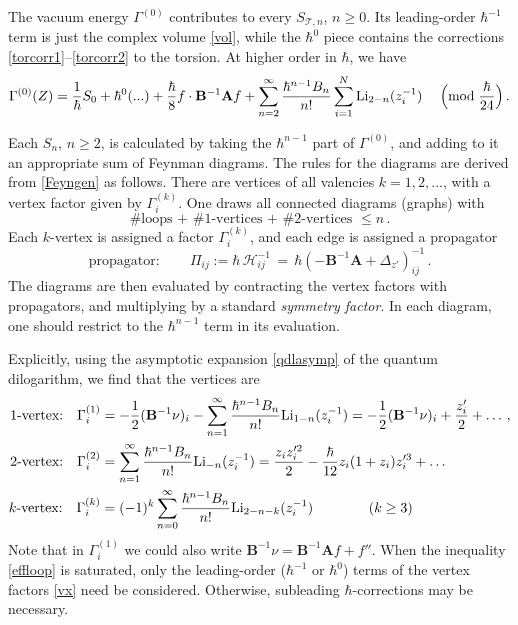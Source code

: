 \documentclass[12pt]{amsart}
\newcommand{\lbl}{\label}
\renewcommand{\eta}{\nu}
\theoremstyle{definition}
\def\be{  \begin{equation} }
\def\ee{  \end{equation} }
\newcommand{\CH}{\mathcal{H}}
\newcommand{\CT}{\mathcal{T}}
\newcommand{\Li}{{\rm Li}}
\newcommand{\mb}{\mathbf}
\numberwithin{equation}{section}
\begin{document}
The vacuum energy $\Gamma^{(0)}$ contributes to every $S_{\CT,n}$, $n\geq 0$. Its leading-order $\hbar^{-1}$ term is just the complex volume \eqref{vol}, while the $\hbar^0$ piece contains 
the corrections \eqref{torcorr1}--\eqref{torcorr2} to the torsion. At 
higher order in $\hbar$, we have
%
\be \Gamma^{(0)}(Z) = \frac{1}{\hbar}S_0+\hbar^0(...)
+\frac{\hbar}{8}f\cdot\mb B^{-1}\mb A f + \sum_{n=2}^\infty 
\frac{\hbar^{n-1} B_{n}}{n!}\sum_{i=1}^N \Li_{2-n}(z_i^{-1})\quad\; 
\Big({\rm mod}\;\frac{\hbar}{24}\Big)\,. \ee



Each $S_n$, $n\geq 2$, is calculated by taking the $\hbar^{n-1}$ part 
of $\Gamma^{(0)}$, and adding to it an appropriate sum of Feynman diagrams. 
The rules for the diagrams are derived from \eqref{Feyngen} as follows. There are vertices of all 
valencies $k=1,2,...$, with a vertex factor given by $\Gamma^{(k)}_i$. One draws all connected diagrams (graphs) with
%
\be \lbl{effloop}
\boxed{\text{\# loops + \# 1-vertices + \# 2-vertices $\leq n$}\,.}
\ee
%
Each $k$-vertex is assigned a factor $\Gamma_i^{(k)}$, and each edge is assigned a propagator
%
\be 
\lbl{prop}
\text{propagator}:\qquad \Pi_{ij}:= \hbar\,\CH^{-1}_{ij} \,
=\, \hbar(-\mb B^{-1}\mb A+\Delta_{z'})^{-1}_{ij}\,.
\ee
%
The diagrams are then evaluated by contracting the vertex factors with propagators, and multiplying by a standard \emph{symmetry factor}. In each diagram, one should restrict to the $\hbar^{n-1}$ term in its evaluation.


Explicitly, using the asymptotic expansion \eqref{qdlasymp} of the quantum dilogarithm, we find that the vertices are 
%
\begin{subequations} 
\lbl{vx}
\begin{align}
\text{1-vertex:}\quad \Gamma^{(1)}_i &= -\frac12(\mb B^{-1}\eta)_i
-\sum_{n=1}^\infty \frac{\hbar^{n-1}B_n}{n!}\Li_{1-n}(z_i^{-1}) 
= -\frac12(\mb B^{-1}\eta)_i  +\frac{z'_i}{2}+\ldots\,,\\
\text{2-vertex:}\quad \Gamma^{(2)}_i &= \sum_{n=1}^\infty 
\frac{\hbar^{n-1}B_n}{n!}\Li_{-n}(z_i^{-1}) = \frac{z_iz_i'^2}{2}
-\frac\hbar{12}z_i(1+z_i)z_i'^3+\ldots\\
\text{$k$-vertex:}\quad\Gamma^{(k)}_i &= (-1)^k \sum_{n=0}^\infty 
\frac{\hbar^{n-1}B_n}{n!}\Li_{2-n-k}(z_i^{-1}) \qquad\qquad (k\geq 3)
\end{align}
\end{subequations}
%
Note that in $\Gamma_i^{(1)}$ we could also write 
$\mb B^{-1}\eta=\mb B^{-1}\mb Af+f''$.
When the inequality \eqref{effloop} is saturated, only the leading-order ($\hbar^{-1}$ or $\hbar^0$) 
terms of the vertex factors \eqref{vx} need be considered. Otherwise, subleading $\hbar$-corrections may be necessary.
\end{document}

